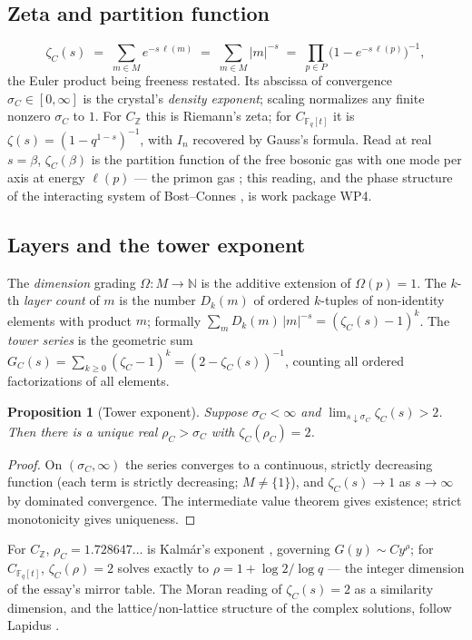 \documentclass[11pt]{article}
\newtheorem{proposition}{Proposition}
\theoremstyle{remark}
\newcommand{\N}{\mathbb{N}}
\newcommand{\Z}{\mathbb{Z}}
\newcommand{\F}{\mathbb{F}}
\begin{document}
\subsection{Zeta and partition function}

\[
\zeta_C(s) \;=\; \sum_{m \in M} e^{-s\,\ell(m)} \;=\; \sum_{m \in M} |m|^{-s}
\;=\; \prod_{p \in P} \bigl(1 - e^{-s\,\ell(p)}\bigr)^{-1},
\]
the Euler product being freeness restated. Its abscissa of convergence $\sigma_C \in [0, \infty]$ is
the crystal's \emph{density exponent}; scaling normalizes any finite nonzero $\sigma_C$ to $1$. For
$C_{\Z}$ this is Riemann's zeta; for $C_{\F_q[t]}$ it is $\zeta(s) = (1 - q^{1-s})^{-1}$, with
$I_n$ recovered by Gauss's formula. Read at real $s = \beta$, $\zeta_C(\beta)$ is the partition
function of the free bosonic gas with one mode per axis at energy $\ell(p)$ --- the primon gas
\cite{Julia}; this reading, and the phase structure of the interacting system of
Bost--Connes \cite{BostConnes}, is work package WP4.

\subsection{Layers and the tower exponent}

The \emph{dimension} grading $\Omega \colon M \to \N$ is the additive extension of $\Omega(p) = 1$.
The $k$-th \emph{layer count} of $m$ is the number $D_k(m)$ of ordered $k$-tuples of non-identity
elements with product $m$; formally
$\sum_m D_k(m)\, |m|^{-s} = (\zeta_C(s) - 1)^k$. The \emph{tower series} is the geometric sum
$G_C(s) = \sum_{k \ge 0} (\zeta_C - 1)^k = (2 - \zeta_C(s))^{-1}$, counting all ordered
factorizations of all elements.

\begin{proposition}[Tower exponent]\label{prop:tower}
Suppose $\sigma_C < \infty$ and $\lim_{s \downarrow \sigma_C} \zeta_C(s) > 2$. Then there is a
unique real $\rho_C > \sigma_C$ with $\zeta_C(\rho_C) = 2$.
\end{proposition}

\begin{proof}
On $(\sigma_C, \infty)$ the series converges to a continuous, strictly decreasing function (each
term is strictly decreasing; $M \ne \{1\}$), and $\zeta_C(s) \to 1$ as $s \to \infty$ by dominated
convergence. The intermediate value theorem gives existence; strict monotonicity gives uniqueness.
\end{proof}

For $C_{\Z}$, $\rho_C = 1.728647\ldots$ is Kalm\'ar's exponent \cite{Kalmar}, governing
$G(y) \sim Cy^{\rho}$; for $C_{\F_q[t]}$, $\zeta_C(\rho) = 2$ solves exactly to
$\rho = 1 + \log 2/\log q$ --- the integer dimension of the essay's mirror table. The Moran reading
of $\zeta_C(s) = 2$ as a similarity dimension, and the lattice/non-lattice structure of the complex
solutions, follow Lapidus \cite{LapidusBook}.
\end{document}
